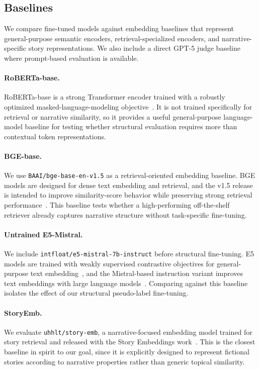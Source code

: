 \subsection{Baselines}

We compare fine-tuned models against embedding baselines that represent general-purpose semantic encoders, retrieval-specialized encoders, and narrative-specific story representations. We also include a direct GPT-5 judge baseline where prompt-based evaluation is available.

\paragraph{RoBERTa-base.}
RoBERTa-base is a strong Transformer encoder trained with a robustly optimized masked-language-modeling objective~\cite{liu2019roberta}. It is not trained specifically for retrieval or narrative similarity, so it provides a useful general-purpose language-model baseline for testing whether structural evaluation requires more than contextual token representations.

\paragraph{BGE-base.}
We use \texttt{BAAI/bge-base-en-v1.5} as a retrieval-oriented embedding baseline. BGE models are designed for dense text embedding and retrieval, and the v1.5 release is intended to improve similarity-score behavior while preserving strong retrieval performance~\cite{xiao2023cpack}. This baseline tests whether a high-performing off-the-shelf retriever already captures narrative structure without task-specific fine-tuning.

\paragraph{Untrained E5-Mistral.}
We include \texttt{intfloat/e5-mistral-7b-instruct} before structural fine-tuning. E5 models are trained with weakly supervised contrastive objectives for general-purpose text embedding~\cite{wang2022text}, and the Mistral-based instruction variant improves text embeddings with large language models~\cite{wang2023improving}. Comparing against this baseline isolates the effect of our structural pseudo-label fine-tuning.

\paragraph{StoryEmb.}
We evaluate \texttt{uhhlt/story-emb}, a narrative-focused embedding model trained for story retrieval and released with the Story Embeddings work~\cite{hatzel2024story}. This is the closest baseline in spirit to our goal, since it is explicitly designed to represent fictional stories according to narrative properties rather than generic topical similarity.

